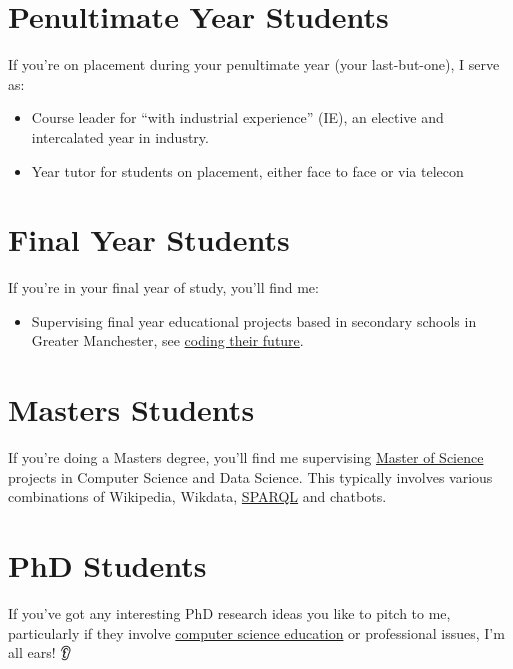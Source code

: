 \documentclass[
  12pt,
]{book}
\providecommand{\tightlist}{%
  \setlength{\itemsep}{0pt}\setlength{\parskip}{0pt}}
\begin{document}
\section{Penultimate Year Students}\label{penultimate}

If you're on placement during your penultimate year (your last-but-one), I serve as:

\begin{itemize}
\tightlist
\item
  Course leader for ``with industrial experience'' (IE), an elective and intercalated year in industry.
\item
  Year tutor for students on placement, either face to face or via telecon
\end{itemize}

\section{Final Year Students}\label{finalyear}

If you're in your final year of study, you'll find me:

\begin{itemize}
\tightlist
\item
  Supervising final year educational projects based in secondary schools in Greater Manchester, see \href{https://personalpages.manchester.ac.uk/staff/duncan.hull/coding-their-future}{coding their future}. \citep{computinged} 👩‍💻👨‍💻
\end{itemize}

\section{Masters Students}\label{masters}

If you're doing a Masters degree, you'll find me supervising \href{https://www.cs.manchester.ac.uk/study/masters/}{Master of Science} projects in Computer Science and Data Science. \citep{r4ds} This typically involves various combinations of Wikipedia, Wikdata, \href{https://en.wikipedia.org/wiki/SPARQL}{SPARQL} \citep{ducharme} and chatbots. 🤖 \citep{myca}

\section{PhD Students}\label{phds}

If you've got any interesting PhD research ideas you like to pitch to me, particularly if they involve \href{https://sigcse.cs.manchester.ac.uk}{computer science education} or professional issues, I'm all ears! 👂
\end{document}
